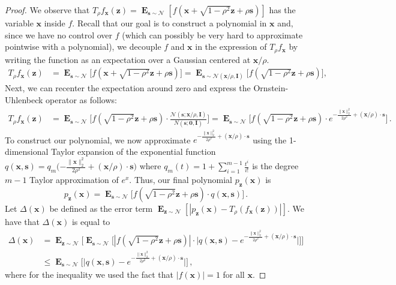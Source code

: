 \documentclass[10pt,a4paper]{article}
\newcommand\twonorm[1]{\|#1\|_2}
\renewcommand\vec[1]{\mathbf{#1}}
\DeclareMathOperator*{\E}{\mathbf{E}}
\newcommand{\normal}{\mathcal{N}}
\newcommand{\1}{\Ind}
\newcommand{\x}{\vec x}
\newcommand{\z}{\vec z}
\newcommand{\Gauss}{\mathcal{N}}
\begin{document}
\begin{proof}
   We observe that  $T_{\rho}f_{\x}(\z)=\E_{\vec s\sim \Gauss}[f(\x+\sqrt{1-\rho^2}\z+\rho \vec s)]$ has 
   the variable $\x$ inside $f$. Recall that our goal is to construct a polynomial in $\x$ and, since we have no control over $f$ (which can possibly be very hard to approximate pointwise with a polynomial), we decouple $f$ and $\x$ in the expression of $T_{\rho}f_{\x}$ by writing the function as an expectation over a Gaussian centered at $\x/\rho$. 
    \begin{align*}
        T_{\rho}f_{\x}(\z)&=\E_{\vec s\sim \Gauss}\bigl[f(\x+\sqrt{1-\rho^2}\z+\rho\vec s)\bigr]
        =\E_{\vec s\sim \Gauss(\vec x/\rho,\vec I)}\bigl[f(\sqrt{1-\rho^2}\z+\rho\vec s)\bigr],
        \end{align*}
        Next, we can recenter the expectation around zero and express the Ornstein-Uhlenbeck operator as follows:
    \begin{align*}
        T_{\rho}f_{\x}(\z) &=\E_{\vec s\sim \Gauss}\biggl[f(\sqrt{1-\rho^2}\z+\rho\vec s)\cdot \frac{\Gauss(\vec s;\x/\rho,\vec I)}{N(\vec s;\vec 0,\vec I)}\biggr] =
        \E_{\vec s\sim \Gauss}\biggl[
        f(\sqrt{1-\rho^2}\z+\rho\vec s)\cdot e^{-\frac{\twonorm{\x}^2}{2\rho^2}+(\x/\rho)\cdot \vec s}
        \biggr] \,.
    \end{align*}
    To construct our polynomial, we now approximate ${e^{-\frac{\twonorm{\x}^2}{2\rho^2}+ (\x/\rho)\cdot\vec s}}$ using the 1-dimensional Taylor expansion of the exponential function $q(\x,\vec s)=q_m\bigl({-\frac{\twonorm{\x}^2}{2\rho^2}+(\x/\rho)\cdot\vec s}\bigr)$ where $q_{m}(t)=1+\sum_{i=1}^{m-1}\frac{t^i}{i!}$ is the degree $m-1$ Taylor approximation of $e^x$. Thus, our final polynomial $p_{\z}(\x)$ is 
    \[
        p_{\z}(\x)=\E_{\vec s\sim \Gauss}\bigl[f(\sqrt{1-\rho^2}\z+\rho\vec s)\cdot q(\x,\vec s)\bigr]\,.
    \]
    Let $\Delta(\x)$ be defined as the error term $\E_{\z \sim \normal}[|p_{\z}(\x)-T_{\rho}(f_{\x}(\z))|]$. 
    We have that $\Delta(\x)$ is equal to 
    \begin{align*}
    \Delta(\x) &=
    \E_{\z\sim \Gauss}\Big[\E_{\vec s\sim \Gauss}\bigl[|f(\sqrt{1-\rho^2}\z+\rho\vec s)|\cdot 
    \big|q(\x,\vec s)-e^{-\frac{\twonorm{\x}^2}{2\rho^2}+(\x/\rho)\cdot\vec s}\big| \Big]  \Big]
    \\
    &\leq 
    \E_{\vec s\sim \Gauss}\Big[\big|q(\x,\vec s)-e^{-\frac{\twonorm{\x}^2}{2\rho^2}+(\x/\rho)\cdot\vec s}\big| \Big]
    \,,
    \end{align*}
    where for the inequality we used the fact that $|f(\vec x)|=1$ for all $\x$.

\end{proof}
\end{document}
